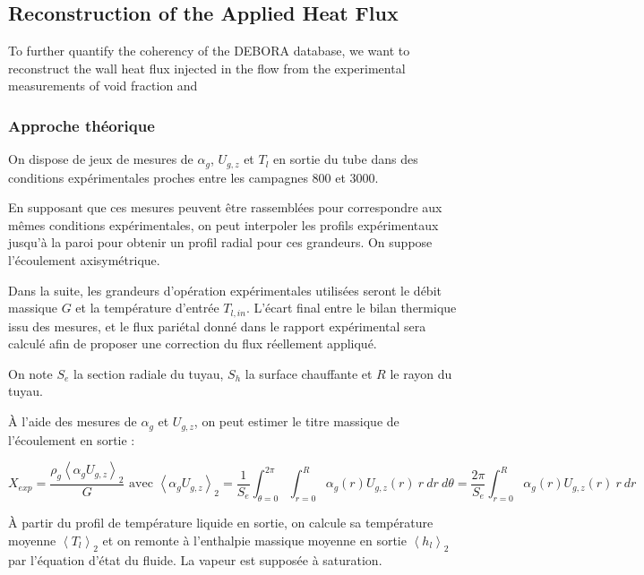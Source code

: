 \subsection{Reconstruction of the Applied Heat Flux}

To further quantify the coherency of the DEBORA database, we want to reconstruct the wall heat flux injected in the flow from the experimental measurements of void fraction and 


\subsubsection{Approche théorique}
\label{sec:analyt}

On dispose de jeux de mesures de $\alpha_{g}$, $U_{g,z}$ et $T_{l}$ en sortie du tube dans des conditions expérimentales proches entre les campagnes 800 et 3000.

\npar
En supposant que ces mesures peuvent être rassemblées pour correspondre aux mêmes conditions expérimentales, on peut interpoler les profils expérimentaux jusqu'à la paroi pour obtenir un profil radial pour ces grandeurs. On suppose l'écoulement axisymétrique.

\npar
Dans la suite, les grandeurs d'opération expérimentales utilisées seront le débit massique $G$ et la température d'entrée $T_{l,in}$. L'écart final entre le bilan thermique issu des mesures, et le flux pariétal donné dans le rapport expérimental sera calculé afin de proposer une correction du flux réellement appliqué.

\npar
On note $S_{e}$ la section radiale du tuyau, $S_{h}$ la surface chauffante et $R$ le rayon du tuyau.

\npar
\`A l'aide des mesures de $\alpha_{g}$ et $U_{g,z}$, on peut estimer le titre massique de l'écoulement en sortie :

\begin{equation}
X_{exp}=\frac{\rho_{g} \left<\alpha_{g}U_{g,z}\right>_{2}}{G} \text{ avec } \left<\alpha_{g}U_{g,z}\right>_{2}=\frac{1}{S_{e}}\int_{\theta=0}^{2\pi}\int_{r=0}^{R}\alpha_{g}(r)U_{g,z}(r)~r~dr~d\theta=\frac{2\pi}{S_{e}}\int_{r=0}^{R}\alpha_{g}(r)U_{g,z}(r)~r~dr
\end{equation}


\npar

\`A partir du profil de température liquide en sortie, on calcule sa température moyenne $\left<T_{l}\right>_{2}$ et on remonte à l'enthalpie massique moyenne en sortie $\left<h_{l}\right>_{2}$ par l'équation d'état du fluide. La vapeur est supposée à saturation.

